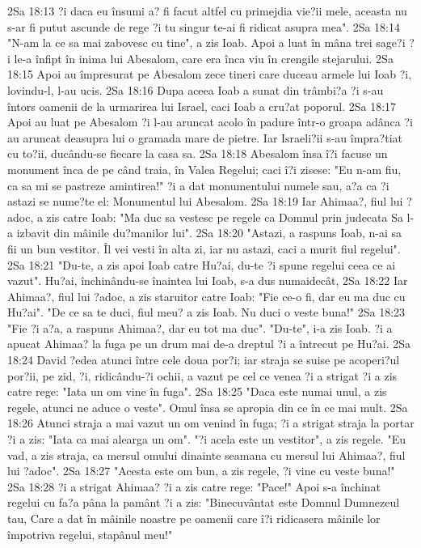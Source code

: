 2Sa 18:13  ?i daca eu însumi a? fi facut altfel cu primejdia vie?ii mele, aceasta nu s-ar fi putut ascunde de rege ?i tu singur te-ai fi ridicat asupra mea".
2Sa 18:14  "N-am la ce sa mai zabovesc cu tine", a zis Ioab. Apoi a luat în mâna trei sage?i ?i le-a înfipt în inima lui Abesalom, care era înca viu în crengile stejarului.
2Sa 18:15  Apoi au împresurat pe Abesalom zece tineri care duceau armele lui Ioab ?i, lovindu-l, l-au ucis.
2Sa 18:16  Dupa aceea Ioab a sunat din trâmbi?a ?i s-au întors oamenii de la urmarirea lui Israel, caci Ioab a cru?at poporul.
2Sa 18:17  Apoi au luat pe Abesalom ?i l-au aruncat acolo în padure într-o groapa adânca ?i au aruncat deasupra lui o gramada mare de pietre. Iar Israeli?ii s-au împra?tiat cu to?ii, ducându-se fiecare la casa sa.
2Sa 18:18  Abesalom însa î?i facuse un monument înca de pe când traia, în Valea Regelui; caci î?i zisese: "Eu n-am fiu, ca sa mi se pastreze amintirea!" ?i a dat monumentului numele sau, a?a ca ?i astazi se nume?te el: Monumentul lui Abesalom.
2Sa 18:19  Iar Ahimaa?, fiul lui ?adoc, a zis catre Ioab: "Ma duc sa vestesc pe regele ca Domnul prin judecata Sa l-a izbavit din mâinile du?manilor lui".
2Sa 18:20  "Astazi, a raspuns Ioab, n-ai sa fii un bun vestitor. Îl vei vesti în alta zi, iar nu astazi, caci a murit fiul regelui".
2Sa 18:21  "Du-te, a zis apoi Ioab catre Hu?ai, du-te ?i spune regelui ceea ce ai vazut". Hu?ai, închinându-se înaintea lui Ioab, s-a dus numaidecât,
2Sa 18:22  Iar Ahimaa?, fiul lui ?adoc, a zis staruitor catre Ioab: "Fie ce-o fi, dar eu ma duc cu Hu?ai". "De ce sa te duci, fiul meu? a zis Ioab. Nu duci o veste buna!"
2Sa 18:23  "Fie ?i a?a, a raspuns Ahimaa?, dar eu tot ma duc". "Du-te", i-a zis Ioab. ?i a apucat Ahimaa? la fuga pe un drum mai de-a dreptul ?i a întrecut pe Hu?ai.
2Sa 18:24  David ?edea atunci între cele doua por?i; iar straja se suise pe acoperi?ul por?ii, pe zid, ?i, ridicându-?i ochii, a vazut pe cel ce venea ?i a strigat ?i a zis catre rege: "Iata un om vine în fuga".
2Sa 18:25  "Daca este numai unul, a zis regele, atunci ne aduce o veste". Omul însa se apropia din ce în ce mai mult.
2Sa 18:26  Atunci straja a mai vazut un om venind în fuga; ?i a strigat straja la portar ?i a zis: "Iata ca mai alearga un om". "?i acela este un vestitor", a zis regele. "Eu vad, a zis straja, ca mersul omului dinainte seamana cu mersul lui Ahimaa?, fiul lui ?adoc".
2Sa 18:27  "Acesta este om bun, a zis regele, ?i vine cu veste buna!"
2Sa 18:28  ?i a strigat Ahimaa? ?i a zis catre rege: "Pace!" Apoi s-a închinat regelui cu fa?a pâna la pamânt ?i a zis: "Binecuvântat este Domnul Dumnezeul tau, Care a dat în mâinile noastre pe oamenii care î?i ridicasera mâinile lor împotriva regelui, stapânul meu!"
